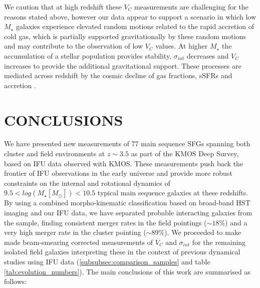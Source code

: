 \documentclass[fleqn,usenatbib]{mn2e}
\begin{document}
We caution that at high redshift these $V_{C}$ measurements are challenging for the reasons stated above, however our data appear to support a scenario in which low $M_{\star}$ galaxies experience elevated random motions related to the rapid accretion of cold gas, which is partially supported gravitationally by these random motions and may contribute to the observation of low $V_{C}$ values.
At higher $M_{\star}$ the accumulation of a stellar population provides stability, $\sigma_{int}$ decreases and $V_{C}$ increases to provide the additional gravitational support.
These processes are mediated across redshift by the cosmic decline of gas fractions, sSFRs and accretion \citep[e.g.][]{Wisnioski2015}. 

  
\section{CONCLUSIONS}\label{sec:conclusion}
We have presented new measurements of 77 main sequence SFGs spanning both cluster and field environments at $z\sim3.5$ as part of the KMOS Deep Survey, based on IFU data observed with KMOS.
These measurements push back the frontier of IFU observations in the early universe and provide more robust constraints on the internal and rotational dynamics of $9.5 < log(M_{\star}[M_{\odot}])< 10.5$ typical main sequence galaxies at these redshifts.
By using a combined morpho-kinematic classification based on broad-band HST imaging and our IFU data, we have separated probable interacting galaxies from the sample, finding consistent merger rates in the field pointings ($\sim18\%$) and a very high merger rate in the cluster pointing ($\sim89\%$).
We proceeded to make made beam-smearing corrected measurements of $V_{C}$ and $\sigma_{int}$ for the remaining isolated field galaxies interpreting these in the context of previous dynamical studies using IFU data (\cref{subsubsec:comparison_samples} and table \ref{tab:evolution_numbers}).
The main conclusions of this work are summarised as follows:
\end{document}
